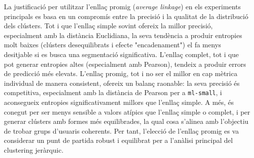 \documentclass[a4paper,12pt]{report}
\begin{document}
La justificació per utilitzar l'enllaç promig (\textit{average linkage}) en els experiments principals es basa en un compromís entre la precisió i la qualitat de la distribució dels clústers. Tot i que l'enllaç simple sovint ofereix la millor precisió, especialment amb la distància Euclidiana, la seva tendència a produir entropies molt baixes (clústers desequilibrats i efecte "encadenament") el fa menys desitjable si es busca una segmentació significativa. L'enllaç complet, tot i que pot generar entropies altes (especialment amb Pearson), tendeix a produir errors de predicció més elevats. L'enllaç promig, tot i no ser el millor en cap mètrica individual de manera consistent, ofereix un balanç raonable: la seva precisió és competitiva, especialment amb la distància de Pearson per a \texttt{ml-small}, i aconsegueix entropies significativament millors que l'enllaç simple. A més, és conegut per ser menys sensible a valors atípics que l'enllaç simple o complet, i per generar clústers amb formes més equilibrades, la qual cosa s'alinea amb l'objectiu de trobar grups d'usuaris coherents. Per tant, l'elecció de l'enllaç promig es va considerar un punt de partida robust i equilibrat per a l'anàlisi principal del clustering jeràrquic.
\end{document}
